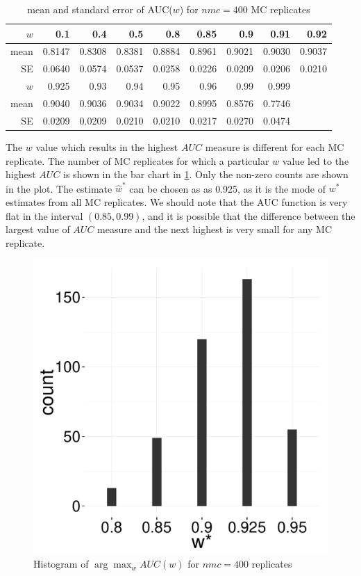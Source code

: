 \documentclass[12pt]{article} %
\begin{document}
\begin{table}[ht]
\centering
\begin{tabular}{rrrrrrrrr}
  \hline
 $w$ & 0.1 & 0.4 & 0.5 & 0.8 & 0.85 & 0.9 & 0.91 & 0.92 \\
  \hline
mean & 0.8147 & 0.8308 & 0.8381 & 0.8884 & 0.8961 & 0.9021 & 0.9030 & 0.9037  \\ 
  SE & 0.0640 & 0.0574 & 0.0537 & 0.0258 & 0.0226 & 0.0209 & 0.0206 & 0.0210   \\ 
	\hline
	  $w$ & 0.925& 0.93 & 0.94 & 0.95 & 0.96 & 0.99 & 0.999 & \\ 
		\hline
		mean & 0.9040 & 0.9036 & 0.9034 & 0.9022 & 0.8995 & 0.8576 & 0.7746 & \\
		SE & 0.0209 & 0.0209 & 0.0210 & 0.0210 & 0.0217 & 0.0270 & 0.0474 &\\
   \hline
\end{tabular}
\caption{mean and standard error of  AUC($w$) for $nmc=400$ MC replicates} 
\label{tab:AUCW}
\end{table}



  The $w$ value  which results in the highest $AUC$ measure  is different for each MC replicate.  The number of  MC replicates  for  which a particular $w$ value led to the highest $AUC$ is shown in  the bar chart in 	\ref{fig:ArgMaxWAUCW}. Only the non-zero counts are  shown in the plot. The estimate $\hat{w}^*$ can be chosen as  as 0.925, as it is the mode of $w^*$ estimates from all MC replicates. We should note that the AUC function is very flat in the interval $(0.85,0.99)$, and it is possible that the difference between the largest value of  $AUC$ measure and the next highest is very small for any MC replicate.
\begin{figure}[h]
	\centering
	
		\includegraphics[scale=0.15]{auc_argmax_hist-paper.pdf}
	
	\caption{Histogram of $\arg\max_w AUC(w)$ for $nmc=400$ replicates}
	\label{fig:ArgMaxWAUCW}
\end{figure}
\end{document}

